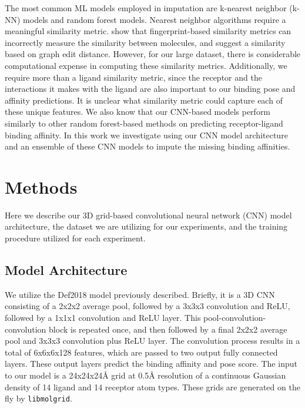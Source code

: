 \documentclass[journal=jmcmar,manuscript=article]{achemso}
\begin{document}
The most common ML models employed in imputation are k-nearest neighbor (k-NN) models and random forest models.\cite{review2}  Nearest neighbor algorithms require a meaningful similarity metric.
 \citet{graphEditDist} show that fingerprint-based similarity metrics can incorrectly measure the similarity between molecules, and suggest a similarity based on graph edit distance.
However, for our large dataset, there is considerable computational expense in computing these similarity metrics. 
Additionally, we require more than a ligand similarity metric, since the receptor and the interactions it makes with the ligand are also important to our binding pose and affinity predictions.
It is unclear what similarity metric could capture each of these unique features.
We also know that our CNN-based models perform similarly to other random forest-based methods on predicting receptor-ligand binding affinity.\cite{crossdocked2020}
In this work we investigate using our CNN model architecture and an ensemble of these CNN models to impute the missing binding affinities.

\section{Methods}
Here we describe our 3D grid-based convolutional neural network (CNN) model architecture, the dataset we are utilizing for our experiments, and the training procedure utilized for each experiment.

\subsection{Model Architecture}
We utilize the Def2018 model previously described.\cite{crossdocked2020}
Briefly, it is a 3D CNN consisting of a 2x2x2 average pool, followed by a 3x3x3 convolution and ReLU, followed by a 1x1x1 convolution and ReLU layer. 
This pool-convolution-convolution block is repeated once, and then followed by a final 2x2x2 average pool and 3x3x3 convolution plus ReLU layer.
The convolution process results in a total of 6x6x6x128 features, which are passed to two output fully connected layers.
These output layers predict the binding affinity and pose score.
The input to our model is a 24x24x24{\AA} grid at 0.5{\AA} resolution of a continuous Gaussian density of 14 ligand and 14 receptor atom types.
These grids are generated on the fly by \texttt{libmolgrid}.\cite{sunseri2019libmolgrid}
\end{document}
